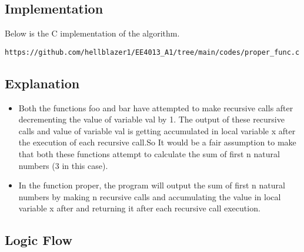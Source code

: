 \documentclass[journal,12pt,twocolumn]{IEEEtran}
\begin{document}
\subsection{Implementation}
Below is the C implementation of the algorithm.
\begin{lstlisting}
https://github.com/hellblazer1/EE4013_A1/tree/main/codes/proper_func.c
\end{lstlisting}

\subsection{Explanation}
\begin{itemize}
    \item Both the functions foo and bar have attempted to make recursive calls after decrementing the value of variable val by 1. The output of these recursive calls and value of variable val is getting accumulated in local variable x after the execution of each recursive call.So It would be a fair assumption to make that both these functions attempt to calculate the sum of first n natural numbers (3 in this case).

    \item In the function proper, the program will output the sum of first n natural numbers by making n recursive calls and accumulating the value in local variable x after and returning it after each recursive call execution.
\end{itemize}

\subsection{Logic Flow}
\begin{figure}[!h]
\centering
{}




\end{figure}
\end{document}
